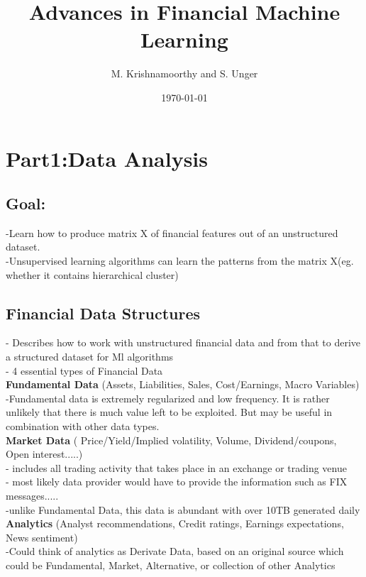 \documentclass{article}
\title{Advances in Financial Machine Learning}
\author{M. Krishnamoorthy and S. Unger}
\date{\today}
\begin{document}
\maketitle
\tableofcontents 

\section{Part1:Data Analysis}
\subsection{Goal: }
-Learn how to produce matrix X of financial features out of an unstructured dataset. \\ 
-Unsupervised learning algorithms can learn the patterns from the matrix X(eg. whether it contains hierarchical cluster)

\subsection{Financial Data Structures}
- Describes how to work with unstructured financial data and from that to derive a structured dataset for Ml algorithms\\ 
- 4 essential types of Financial Data\\ 

\textbullet \textbf{Fundamental Data} (Assets, Liabilities, Sales, Cost/Earnings, Macro Variables)\\ 
-Fundamental data is extremely regularized and low frequency.  
It is rather unlikely that there is much value left to be exploited.  But may be useful in combination with other data types.\\ 

\textbullet\textbf{Market Data }( Price/Yield/Implied volatility, Volume, Dividend/coupons, Open interest.....)\\ 
- includes all trading activity that takes place in an exchange or trading venue\\ 
-  most likely data provider would have to provide the information such as FIX messages.....\\ 
-unlike Fundamental Data, this data is abundant with over 10TB generated daily\\ 

\textbullet \textbf{Analytics} (Analyst recommendations, Credit ratings, Earnings expectations, News sentiment)\\ 
-Could think of analytics as Derivate Data, based on an original source which could be Fundamental, Market, Alternative, or collection of other Analytics\\ 
\end{document}
